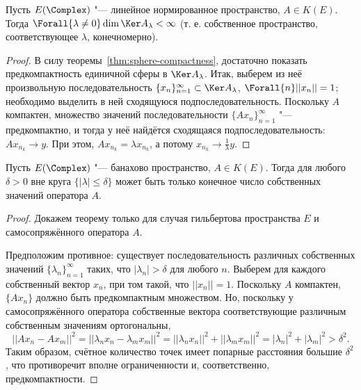 \documentclass[main]{subfiles}
\begin{document}
\begin{theorem}
  Пусть \( E(\Complex) \) "--- линейное нормированное пространство,
  \( A \in K(E) \).
  Тогда \( \Forall{\lambda \ne 0} \dim \Ker A_\lambda < \infty \)
  (т. е. собственное пространство,
  соответствующее \( \lambda \),
  конечномерно).
\end{theorem}
\begin{proof}
  В силу теоремы~\ref{thm:sphere-compactness},
  достаточно показать предкомпактность
  единичной сферы в \( \Ker A_\lambda \).
  Итак, выберем из неё
  произвольную последовательность
  \( \{ x_n \}_{n=1}^\infty \subset \Ker A_\lambda \),
  \( \Forall{n} ||x_n|| = 1 \);
  необходимо выделить в ней
  сходящуюся подпоследовательность.
  Поскольку \( A \) компактен,
  множество значений последовательности
  \( \{ A x_n \}_{n=1}^\infty \) "--- предкомпактно,
  и тогда у неё найдётся сходящаяся подпоследовательность:
  \( A x_{n_k} \to y \).
  При этом, \( A x_{n_k} = \lambda x_{n_k} \),
  а потому
  \( x_{n_k} \to \frac{1}\lambda y \).
\end{proof}

\begin{theorem}\label{thm:compact-spectrum-bounds}%
  Пусть \( E(\Complex) \) "--- банахово пространство, \( A \in K(E) \).
  Тогда для любого \( \delta > 0 \) вне круга
  \( \{ |\lambda| \le \delta \} \) может быть
  только конечное число собственных значений оператора \( A \).
\end{theorem}
\begin{proof}
  Докажем теорему только для случая
  гильбертова пространства \( E \)
  и самосопряжённого оператора \( A \).

  Предположим противное: существует последовательность
  различных собственных значений \( \{ \lambda_n \}_{n=1}^\infty \)
  таких, что \( |\lambda_n| > \delta \) для любого \( n \).
  Выберем для каждого собственный вектор \( x_n \),
  при том такой, что \( ||x_n|| = 1 \).
  Поскольку \( A \) компактен,
  \( \{ A x_n \} \) должно быть предкомпактным множеством.
  Но, поскольку у самосопряжённого оператора
  собственные вектора соответствующие
  различным собственным значениям
  ортогональны,
  \[
    ||A x_n - A x_m||^2 = ||\lambda_n x_n - \lambda_m x_m||^2 =
    ||\lambda_n x_n||^2 + ||\lambda_m x_m||^2 =
    |\lambda_n|^2 + |\lambda_m|^2 > \delta^2.
  \]
  Таким образом, счётное количество точек
  имеет попарные расстояния большие \( \delta^2 \),
  что противоречит вполне ограниченности и,
  соответственно, предкомпактности.
\end{proof}
\end{document}
